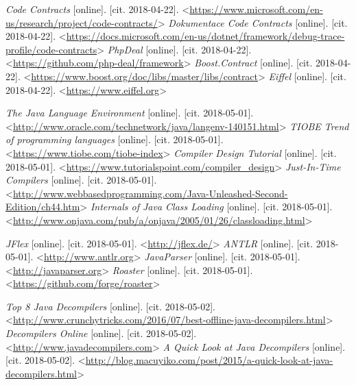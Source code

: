 \begin{thebibliography}{99}
 {\it Code Contracts} [online]. [cit. 2018-04-22]. \textless\url{https://www.microsoft.com/en-us/research/project/code-contracts/}\textgreater
{} {\it Dokumentace Code Contracts} [online]. [cit. 2018-04-22]. \textless\url{https://docs.microsoft.com/en-us/dotnet/framework/debug-trace-profile/code-contracts}\textgreater
{} {\it PhpDeal} [online]. [cit. 2018-04-22]. \textless\url{https://github.com/php-deal/framework}\textgreater
{} {\it Boost.Contract} [online]. [cit. 2018-04-22]. \textless\url{https://www.boost.org/doc/libs/master/libs/contract}\textgreater
{} {\it Eiffel} [online]. [cit. 2018-04-22]. \textless\url{https://www.eiffel.org}\textgreater

 {\it The Java Language Environment} [online]. [cit. 2018-05-01]. \textless\url{http://www.oracle.com/technetwork/java/langenv-140151.html}\textgreater
{} {\it TIOBE Trend of programming languages} [online]. [cit. 2018-05-01]. \textless\url{https://www.tiobe.com/tiobe-index}\textgreater
{} {\it Compiler Design Tutorial} [online]. [cit. 2018-05-01]. \textless\url{https://www.tutorialspoint.com/compiler_design}\textgreater
{} {\it Just-In-Time Compilers} [online]. [cit. 2018-05-01]. \textless\url{http://www.webbasedprogramming.com/Java-Unleashed-Second-Edition/ch44.htm}\textgreater
{} {\it Internals of Java Class Loading} [online]. [cit. 2018-05-01]. \textless\url{http://www.onjava.com/pub/a/onjava/2005/01/26/classloading.html}\textgreater

 {\it JFlex} [online]. [cit. 2018-05-01]. \textless\url{http://jflex.de/}\textgreater
{} {\it ANTLR} [online]. [cit. 2018-05-01]. \textless\url{http://www.antlr.org}\textgreater
{} {\it JavaParser} [online]. [cit. 2018-05-01]. \textless\url{http://javaparser.org}\textgreater
{} {\it Roaster} [online]. [cit. 2018-05-01]. \textless\url{https://github.com/forge/roaster}\textgreater




 {\it Top 8 Java Decompilers} [online]. [cit. 2018-05-02]. \textless\url{http://www.crunchytricks.com/2016/07/best-offline-java-decompilers.html}\textgreater
{} {\it Decompilers Online} [online]. [cit. 2018-05-02]. \textless\url{http://www.javadecompilers.com}\textgreater
{} {\it A Quick Look at Java Decompilers} [online]. [cit. 2018-05-02]. \textless\url{http://blog.macuyiko.com/post/2015/a-quick-look-at-java-decompilers.html}\textgreater


\end{thebibliography}
